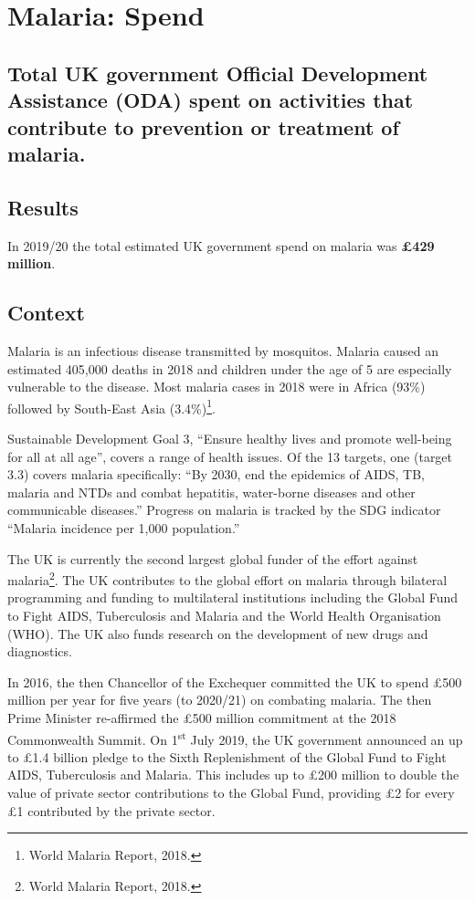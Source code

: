 \chapter{Malaria: Spend}

\section*{Total UK government Official Development Assistance (ODA) spent on activities that contribute to prevention or treatment of malaria.} %

\thispagestyle{empty}

\section{Results}

In 2019/20 the total estimated UK government spend on malaria was \textbf{\pounds 429 million}. %

\section{Context}

Malaria is an infectious disease transmitted by mosquitos. %
Malaria caused an estimated 405,000 deaths in 2018 and children under the age of 5 are especially vulnerable to the disease. Most malaria cases in 2018 were in Africa (93\%) followed by South-East Asia (3.4\%)\footnote{World Malaria Report, 2018.}. %

Sustainable Development Goal 3, ``Ensure healthy lives and promote well-being for all at all age'', covers a range of health issues. %
Of the 13 targets, one (target 3.3) covers malaria specifically: ``By 2030, end the epidemics of AIDS, TB, malaria and NTDs and combat hepatitis, water-borne diseases and other communicable diseases.'' %
Progress on malaria is tracked by the SDG indicator ``Malaria incidence per 1,000 population.'' %

The UK is currently the second largest global funder of the effort against malaria\footnote{World Malaria Report, 2018.}. %
The UK contributes to the global effort on malaria through bilateral programming and funding to multilateral institutions including the Global Fund to Fight AIDS, Tuberculosis and Malaria and the World Health Organisation (WHO). %
The UK also funds research on the development of new drugs and diagnostics. %

In 2016, the then Chancellor of the Exchequer committed the UK to spend \pounds 500 million per year for five years (to 2020/21) on combating malaria. %
The then Prime Minister re-affirmed the \pounds 500 million commitment at the 2018 Commonwealth Summit. %
On 1\textsuperscript{st} July 2019, the UK government announced an up to \pounds 1.4 billion pledge to the Sixth Replenishment of the Global Fund to Fight AIDS, Tuberculosis and Malaria. %
This includes up to \pounds 200 million to double the value of private sector contributions to the Global Fund, providing \pounds 2 for every \pounds 1 contributed by the private sector. %

